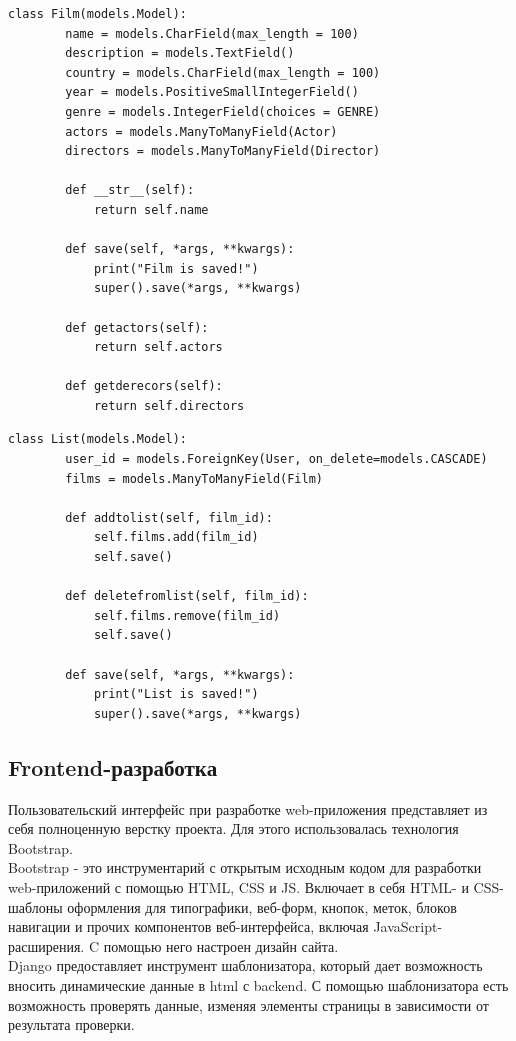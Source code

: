 \documentclass[a4paper, 14pt]{article}
\begin{document}
	\newpage
	\begin{lstlisting}[label=some-code,caption=Класс <<Фильм>>]
	class Film(models.Model):	
		name = models.CharField(max_length = 100)
		description = models.TextField()
		country = models.CharField(max_length = 100)
		year = models.PositiveSmallIntegerField()
		genre = models.IntegerField(choices = GENRE)
		actors = models.ManyToManyField(Actor)
		directors = models.ManyToManyField(Director)
		
		def __str__(self):
			return self.name
		
		def save(self, *args, **kwargs):
			print("Film is saved!")
			super().save(*args, **kwargs)
		
		def getactors(self):
			return self.actors
			
		def getderecors(self):
			return self.directors
	\end{lstlisting}
	
	\begin{lstlisting}[label=some-code,caption=Класс <<Список>>]
	class List(models.Model):
		user_id = models.ForeignKey(User, on_delete=models.CASCADE)
		films = models.ManyToManyField(Film)
		
		def addtolist(self, film_id):
			self.films.add(film_id)
			self.save()
		
		def deletefromlist(self, film_id):
			self.films.remove(film_id)
			self.save()
			
		def save(self, *args, **kwargs):
			print("List is saved!")
			super().save(*args, **kwargs)
	\end{lstlisting}
	
	\subsection{Frontend-разработка}
	
	Пользовательский интерфейс при разработке web-приложения представляет из себя полноценную верстку проекта. Для этого использовалась технология Bootstrap. \\
	
	Bootstrap - это инструментарий с открытым исходным кодом для разработки web-приложений с помощью HTML, CSS и JS. Включает в себя HTML- и CSS-шаблоны оформления для типографики, веб-форм, кнопок, меток, блоков навигации и прочих компонентов веб-интерфейса, включая JavaScript-расширения. C помощью него настроен дизайн сайта.  \cite{3} \\
	
	Django предоставляет инструмент шаблонизатора, который дает возможность вносить динамические данные в html с backend. С помощью шаблонизатора есть возможность проверять данные, изменяя элементы страницы в зависимости от результата проверки.
	
\end{document}
